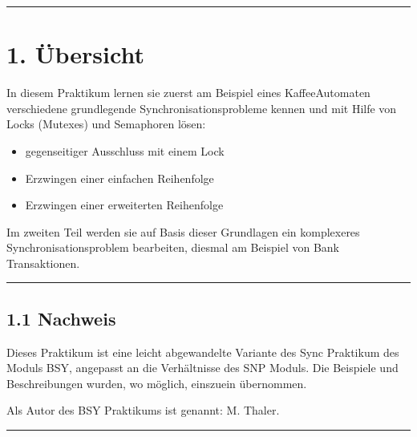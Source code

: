 \documentclass[a4paper,10pt,english]{report}
\begin{document}
\bigskip\hrule\bigskip



\section{1. Übersicht}
\label{\detokenize{P08_Sync/README:ubersicht}}
\sphinxAtStartPar
{}

\sphinxAtStartPar
{}

\sphinxAtStartPar
In diesem Praktikum lernen sie zuerst am Beispiel eines Kaffee\sphinxhyphen{}Automaten verschiedene grundlegende Synchronisationsprobleme kennen und mit Hilfe von Locks (Mutexes) und Semaphoren lösen:
\begin{itemize}
\item {} 
\sphinxAtStartPar
gegenseitiger Ausschluss mit einem Lock

\item {} 
\sphinxAtStartPar
Erzwingen einer einfachen Reihenfolge

\item {} 
\sphinxAtStartPar
Erzwingen einer erweiterten Reihenfolge

\end{itemize}

\sphinxAtStartPar
Im zweiten Teil werden sie auf Basis dieser Grundlagen ein komplexeres Synchronisationsproblem bearbeiten, diesmal am Beispiel von Bank Transaktionen.


\bigskip\hrule\bigskip



\subsection{1.1 Nachweis}
\label{\detokenize{P08_Sync/README:nachweis}}
\sphinxAtStartPar
Dieses Praktikum ist eine leicht abgewandelte Variante des Sync Praktikum des Moduls BSY, angepasst an die Verhältnisse des SNP Moduls. Die Beispiele und Beschreibungen wurden, wo möglich, eins\sphinxhyphen{}zu\sphinxhyphen{}ein übernommen.

\sphinxAtStartPar
Als Autor des BSY Praktikums ist genannt: M. Thaler.


\bigskip\hrule\bigskip
\end{document}
